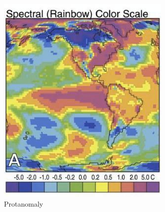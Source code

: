 \documentclass[11pt]{isuthesis}\usepackage[]{graphicx}\usepackage[]{color}
\begin{document}
\begin{figure}[!htbp]
\begin{minipage}[c]{.75\textwidth}
\hfil\begin{subfigure}[b]{.32\textwidth}\centering
  \includegraphics[width=\textwidth]{RainbowScaleOrig-protanomaly}
  \caption{Protanomaly}
\end{subfigure}\hfil
\begin{subfigure}[b]{.32\textwidth}\centering

\end{subfigure}
\end{minipage}
\end{figure}
\end{document}
